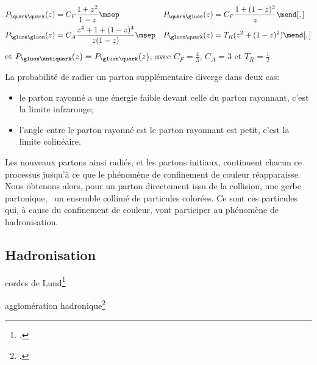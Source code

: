 \begin{align}
P_{\quark\quark}(z) &= C_F \frac{1+z^2}{1-z} \msep&
P_{\quark\gluon}(z) &= C_F \frac{1+(1-z)^2}{z} \mend[,]
\\
P_{\gluon\gluon}(z) &= C_A \frac{z^4 + 1 + (1-z)^4}{z(1-z)} \msep&
P_{\gluon\quark}(z) &= T_R (z^2+(1-z)^2) \mend[,]
\end{align}
et $P_{\gluon\antiquark}(z) = P_{\gluon\quark}(z)$,
avec
$C_F=\frac{4}{3}$,
$C_A = 3$ et
$T_R=\frac{1}{2}$.
\par La probabilité de radier un parton supplémentaire diverge dans deux cas:
\begin{itemize}
\item le parton rayonné a une énergie faible devant celle du parton rayonnant, c'est la limite infrarouge;
\item l'angle entre le parton rayonné est le parton rayonnant est petit, c'est la limite colinéaire.
\end{itemize}

Les nouveaux partons ainsi radiés, et les partons initiaux, continuent chacun ce processus jusqu'à ce que le phénomène de confinement de couleur réapparaisse. Nous obtenons alors, pour un parton directement issu de la collision, une gerbe partonique, \ie\ un ensemble collimé de particules colorées. Ce sont ces particules qui, à cause du confinement de couleur, vont participer au phénomène de hadronisation.

\cite{salam2010elements}

\subsection{Hadronisation}\label{chapter-JERC-section-jets-subsec-hadronisation}

cordes de Lund\footcite{Andersson_parton_fragmentation}

agglomération hadronique\footcite{Winter_2004}
